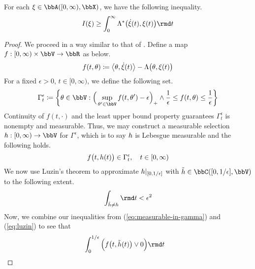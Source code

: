 \begin{proposition}
  \label{proposition:rf-lower-bound}
  For each $\pathVar \in \acpathSpace{[0,\infty)}{\stateSpace}$, we have the following inequality.
  \begin{equation*}
    \rf(\pathVar) \geq \int_0^\infty \ode^*\big( \dot\pathVar(t), \pathVar(t)\big) \rmd t
  \end{equation*}
\end{proposition}

\begin{proof}
  \label{proof:proposition:rf-lower-bound}
  We proceed in a way similar to that of \cite{puhalskii2001}.
  Define a map $f: [0,\infty) \times \vecSpace \rightarrow \bbR$ as below.
  \begin{equation*}
    f(t, \theta) \coloneqq {\big\langle \theta, \dot{\xi}(t) \big\rangle} - \Lambda\big(\theta, \xi(t)\big)
  \end{equation*}
  For a fixed $\epsilon > 0$, $t \in [0,\infty)$, we define the following set.
  \begin{equation*}
    \Gamma^\epsilon_t \defeq \left\{ \twistVar \in \vecSpace : \Big( \sup_{\twistVar' \in \vecSpace} f(t, \twistVar') - \epsilon \Big)_+ \wedge \frac1\epsilon \leq f(t, \twistVar) \leq \frac1\epsilon \right\}
  \end{equation*}
  Continuity of $f(t,\cdot)$ and the least upper bound property guarantees $\Gamma^\epsilon_t$ is nonempty and measurable.
  Thus, we may construct a measurable selection $\twistFunc: [0,\infty) \rightarrow \vecSpace$ for $\Gamma^\epsilon$, which is to say $h$ is Lebesgue measurable and the following holds.
  \begin{equation}
    \label{eq:measurable-in-gamma}
    f\big(t, h(t)\big) \in \Gamma^\epsilon_t, \quad t \in [0,\infty)
  \end{equation}
  We now use Luzin's theorem to approximate $h|_{[0,1/\epsilon]}$ with $\tilde\twistFunc \in \cpathSpace{[0,1/\epsilon]}{\vecSpace}$ to the following extent.
  \begin{equation}
    \label{eq:luzin}
    \int_{\tilde\twistFunc\neq\twistFunc}\rmd t < \epsilon^2
  \end{equation}
  Now, we combine our inequalities from (\ref{eq:measurable-in-gamma}) and (\ref{eq:luzin}) to see that
  \begin{align}
    \notag
    &\hspace{-1em}\int_0^{1/\epsilon} \Big( f\big(t, \tilde\twistFunc(t)\big) \vee 0 \Big) \rmd t \\

\end{align}
\end{proof}
